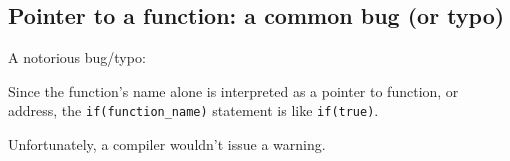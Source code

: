 \subsection{Pointer to a function: a common bug (or typo)}

A notorious bug/typo:



Since the function's name alone is interpreted as a pointer to function, or address,
the \verb|if(function_name)| statement is like \verb|if(true)|.

Unfortunately, a \CCpp compiler wouldn't issue a warning.

